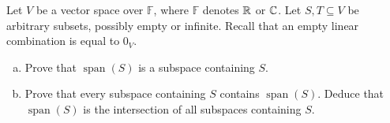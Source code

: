 \begin{exercise}
  \label{ex:hw01:span-and-containing-subspaces}
  Let \(V\) be a vector space over \(\mathbb F\), where
  \(\mathbb F\) denotes \(\mathbb{R}\) or \(\mathbb{C}\). Let \(S,T\subseteq V\)
  be arbitrary subsets, possibly empty or infinite. Recall that an empty
  linear combination is equal to \(0_V\).
  \begin{enumerate}[(a)][2]
    \item Prove that \(\operatorname{span}(S)\) is a subspace containing \(S\).
    \item Prove that every subspace containing \(S\) contains
      \(\operatorname{span}(S)\). Deduce that \(\operatorname{span}(S)\)
      is the intersection of all subspaces containing \(S\).
  \end{enumerate}
\end{exercise}
